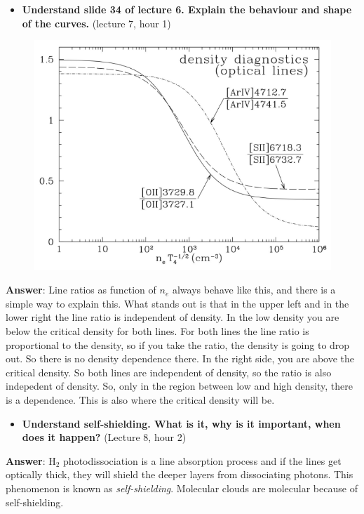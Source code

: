 \documentclass[11pt]{article}
\makeatletter
\def\maxwidth{\ifdim\Gin@nat@width>\linewidth\linewidth
    \else\Gin@nat@width\fi}
\let\Oldincludegraphics\includegraphics
\renewcommand{\includegraphics}[1]{\Oldincludegraphics[width=.8\maxwidth]{#1}}
\providecommand{\tightlist}{%
      \setlength{\itemsep}{0pt}\setlength{\parskip}{0pt}}
\makeatother
\begin{document}
    \begin{itemize}
\tightlist
\item
  \textbf{Understand slide 34 of lecture 6. Explain the behaviour and
  shape of the curves.} (lecture 7, hour 1)
\end{itemize}

\begin{figure}
\centering
\includegraphics{figs/fig_4.png}
\caption{}
\end{figure}

    \textbf{Answer}: Line ratios as function of \(n_e\) always behave like
this, and there is a simple way to explain this. What stands out is that
in the upper left and in the lower right the line ratio is independent
of density. In the low density you are below the critical density for
both lines. For both lines the line ratio is proportional to the
density, so if you take the ratio, the density is going to drop out. So
there is no density dependence there. In the right side, you are above
the critical density. So both lines are independent of density, so the
ratio is also indepedent of density. So, only in the region between low
and high density, there is a dependence. This is also where the critical
density will be.

    \begin{itemize}
\tightlist
\item
  \textbf{Understand self-shielding. What is it, why is it important,
  when does it happen?} (Lecture 8, hour 2)
\end{itemize}

\textbf{Answer}: H\(_2\) photodissociation is a line absorption process
and if the lines get optically thick, they will shield the deeper layers
from dissociating photons. This phenomenon is known as
\emph{self-shielding}. Molecular clouds are molecular because of
self-shielding.
\end{document}
